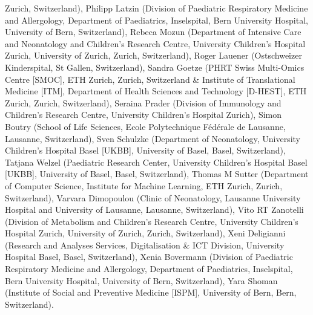 Zurich, Switzerland), Philipp Latzin (Division of Paediatric Respiratory Medicine and Allergology, Department of Paediatrics, Inselspital, Bern University Hospital, University of Bern, Switzerland), Rebeca Mozun (Department of Intensive Care and Neonatology and Children’s Research Centre, University Children’s Hospital Zurich, University of Zurich, Zurich, Switzerland), Roger Lauener (Ostschweizer Kinderspital, St Gallen, Switzerland), Sandra Goetze (PHRT Swiss Multi-Omics Centre [SMOC], ETH Zurich, Zurich, Switzerland \& Institute of Translational Medicine [ITM], Department of Health Sciences and Technology [D-HEST], ETH Zurich, Zurich, Switzerland), Seraina Prader (Division of Immunology and Children’s Research Centre, University Children’s Hospital Zurich), Simon Boutry (School of Life Sciences, Ecole Polytechnique Fédérale de Lausanne, Lausanne, Switzerland), Sven Schulzke (Department of Neonatology, University Children's Hospital Basel [UKBB], University of Basel, Basel, Switzerland), Tatjana Welzel (Paediatric Research Center, University Children's Hospital Basel [UKBB], University of Basel, Basel, Switzerland), Thomas M Sutter (Department of Computer Science, Institute for Machine Learning, ETH Zurich, Zurich, Switzerland), Varvara Dimopoulou (Clinic of Neonatology, Lausanne University Hospital and University of Lausanne, Lausanne, Switzerland), Vito RT Zanotelli (Division of Metabolism and Children’s Research Centre, University Children’s Hospital Zurich, University of Zurich, Zurich, Switzerland), Xeni Deligianni (Research and Analyses Services, Digitalisation \& ICT Division, University Hospital Basel, Basel, Switzerland), Xenia Bovermann (Division of Paediatric Respiratory Medicine and Allergology, Department of Paediatrics, Inselspital, Bern University Hospital, University of Bern, Switzerland), Yara Shoman (Institute of Social and Preventive Medicine [ISPM], University of Bern, Bern, Switzerland).

\clearpage


